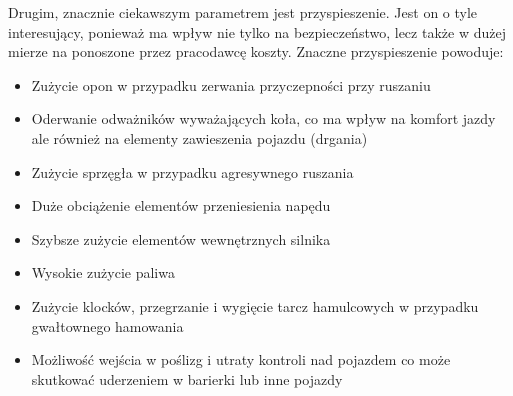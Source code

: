 Drugim, znacznie ciekawszym parametrem jest przyspieszenie. Jest on o tyle interesujący, ponieważ ma wpływ nie tylko na bezpieczeństwo, lecz także w dużej mierze na ponoszone przez pracodawcę koszty. Znaczne przyspieszenie powoduje:

\begin{itemize}
\item Zużycie opon w przypadku zerwania przyczepności przy ruszaniu
\item Oderwanie odważników wyważających koła, co ma wpływ na komfort jazdy ale również na elementy zawieszenia pojazdu (drgania)
\item Zużycie sprzęgła w przypadku agresywnego ruszania
\item Duże obciążenie elementów przeniesienia napędu
\item Szybsze zużycie elementów wewnętrznych silnika
\item Wysokie zużycie paliwa 
\item Zużycie klocków, przegrzanie i wygięcie tarcz hamulcowych w przypadku gwałtownego hamowania
\item Możliwość wejścia w poślizg i utraty kontroli nad pojazdem co może skutkować uderzeniem w barierki lub inne pojazdy
\end{itemize}

